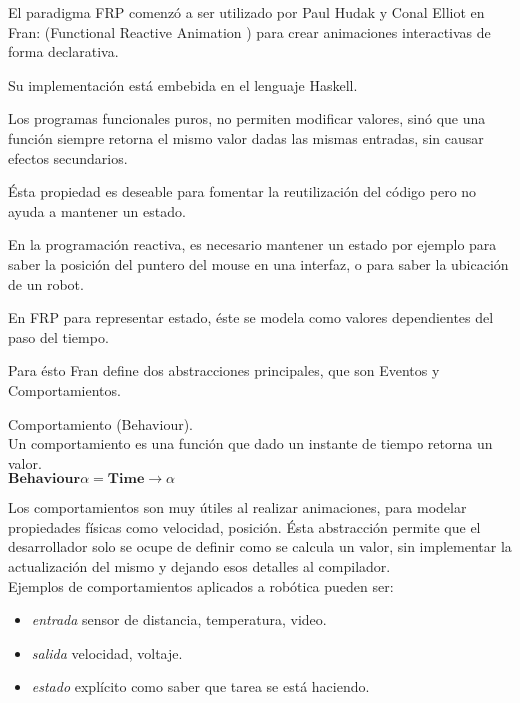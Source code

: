 

El paradigma FRP comenzó a ser utilizado por Paul Hudak y Conal Elliot en
Fran: (Functional Reactive Animation \cite{ElliottHudak97:Fran})
para crear animaciones interactivas de forma declarativa.

Su implementación está embebida en el lenguaje Haskell.

Los programas funcionales puros, no permiten modificar valores,
sinó que una función siempre retorna el mismo valor dadas las mismas
entradas, sin causar efectos secundarios.

Ésta propiedad es deseable para fomentar la reutilización del código
pero no ayuda a mantener un estado.

En la programación reactiva, es necesario mantener un estado por
ejemplo para saber la posición del puntero del mouse en una interfaz,
o para saber la ubicación de un robot.

En FRP para representar estado, éste se modela como valores dependientes
del paso del tiempo.

Para ésto Fran define dos abstracciones principales,
que son Eventos y Comportamientos.
 
\begin{definicion}
  Comportamiento (Behaviour).\\

  Un comportamiento es una función que dado un instante de tiempo
  retorna un valor.\\
  
  $\textbf{Behaviour} \alpha = \textbf{Time} \rightarrow \alpha$

\end{definicion}

  Los comportamientos son muy útiles al realizar animaciones,
para modelar propiedades físicas como velocidad, posición.
  Ésta abstracción permite que el desarrollador solo se ocupe de
definir como se calcula un valor, sin implementar la actualización
del mismo y dejando esos detalles al compilador.\\

  Ejemplos de comportamientos aplicados a robótica pueden ser:

\begin{itemize}
  \item \textit{entrada} sensor de distancia, temperatura, video.
  \item \textit{salida} velocidad, voltaje.
  \item \textit{estado} explícito como saber que tarea se está haciendo.
\end{itemize}

